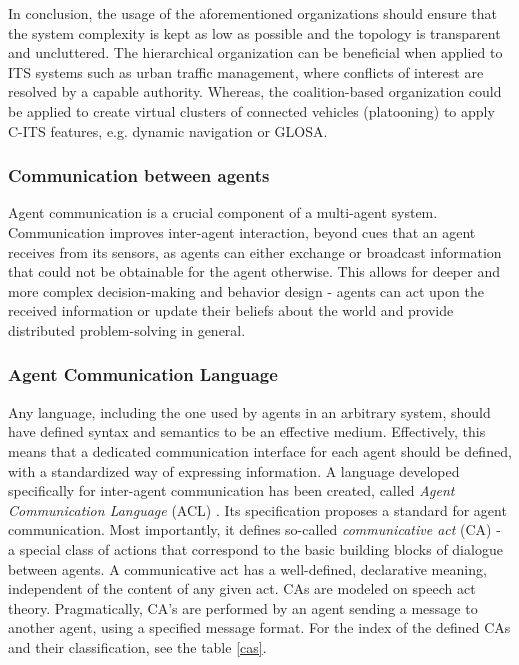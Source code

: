 \documentclass[0main.tex]{subfiles}
\begin{document}
In conclusion, the usage of the aforementioned organizations should ensure that the system complexity 
is kept as low as possible and the topology is transparent and uncluttered. The hierarchical 
organization can be beneficial when applied to ITS systems such as urban traffic management, where 
conflicts of interest are resolved by a capable authority. Whereas, the coalition-based 
organization could be applied to create virtual clusters of connected vehicles (platooning) to apply 
C-ITS features, e.g. dynamic navigation or GLOSA.

\subsubsection{Communication between agents}

Agent communication is a crucial component of a multi-agent system.  Communication improves
inter-agent interaction, beyond cues that an agent receives from its sensors, as agents can
either exchange or broadcast information that could not be obtainable for the agent otherwise.
This allows for deeper and more complex decision-making and behavior design - agents can act
upon the received information or update their beliefs about the world and provide distributed
problem-solving in general. 

\subsubsection{Agent Communication Language}\label{sec-acl}

Any language, including the one used by agents in an arbitrary system, should have defined syntax and 
semantics to be an effective medium. Effectively, this means that a dedicated communication
interface for each agent should be defined, with a standardized way of expressing information. 
A language developed specifically for inter-agent communication has been created, 
called \emph{Agent Communication Language} (ACL) \cite{IntelligentPhysicalAgents2001}. 
Its specification proposes a standard for agent communication. Most importantly, it defines 
so-called \emph{communicative act} (CA) - a special class of actions that correspond to the basic
building blocks of dialogue between agents. A communicative act has a well-defined, declarative
meaning, independent of the content of any given act. CAs are modeled on speech act theory.
Pragmatically, CA's are performed by an agent sending a message to another agent, using a
specified message format. For the index of the defined CAs and their classification, see the
table \ref{cas}.
\end{document}
